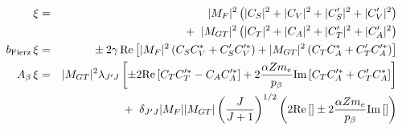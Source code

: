 


\begin{eqnarray}
    \xi &=& 
    	|M_F|^2    \left( |C_S|^2 + |C_V|^2 + |C_S^\prime|^2 + |C_V^\prime|^2 \right) 
		\nonumber \\ && + \;\; 
		|M_{GT}|^2 \left( |C_T|^2 + |C_A|^2 + |C_T^\prime|^2 + |C_A^\prime|^2 \right)
	\label{eq:jtw_xi} \\
    b_{\mathrm{Fierz}} \, \xi &=& \pm \: 2\gamma \, \textrm{Re}\left[ |M_F|^2 \left( C_S C_V^* + C_S^\prime C_V^{\prime *} \right) + |M_{GT}|^2 \left( C_T C_A^* + C_T^{\prime} C_A^{\prime *} \right) \right] 
    \label{eq:jtw_bxi} \\
    A_{\beta} \, \xi &=& |M_{GT}|^2 \lambda_{J^\prime J} \left[ \pm 2 \textrm{Re} \left[ C_T C_T^{\prime *} - C_A C_A^{\prime *} \right] + 2 \frac{\alpha Z m_e }{p_{\beta}} \textrm{Im}\left[ C_T C_A^{\prime *} + C_T^\prime C_A^* \right] \right] 
		\nonumber \\ && + \;\; 
		\delta_{J^\prime J} |M_F| |M_{GT}| \left( \frac{J}{J+1} \right)^{1/2} \left( 2 \textrm{Re}\left[ \right] \pm 2 \frac{\alpha Z m_e }{p_{\beta}} \textrm{Im} \left[ \right] \right)
	\label{eq:jtw_Abetaxi}
\end{eqnarray}


